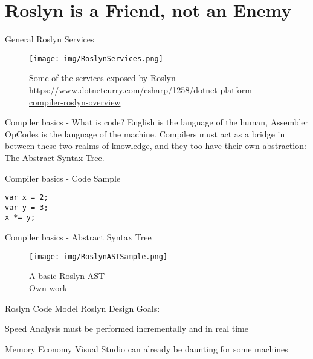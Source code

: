 \documentclass[10pt]{beamer}
\begin{document}
\section{Roslyn is a Friend, not an Enemy}
\begin{frame}{General Roslyn Services}
    \begin{figure}
        \center
        \texttt{[image: img/RoslynServices.png]}
        \caption{Some of the services exposed by Roslyn \\ \tiny{\href{Taken from DotNetCurry}{https://www.dotnetcurry.com/csharp/1258/dotnet-platform-compiler-roslyn-overview}}}
    \end{figure}
\end{frame}

\begin{frame}{Compiler basics - What is code?}
English is the language of the human, Assembler OpCodes is the language of the machine. Compilers must act as a bridge in between these two realms of knowledge, and they too have their own abstraction: The Abstract Syntax Tree.
\end{frame}

\begin{frame}[fragile]{Compiler basics - Code Sample}
\begin{verbatim}
var x = 2;
var y = 3;
x *= y;
\end{verbatim}
\end{frame}

\begin{frame}{Compiler basics - Abstract Syntax Tree}
    \begin{figure}
        \center
        \texttt{[image: img/RoslynASTSample.png]}
        \caption{A basic Roslyn AST \\ \tiny{Own work}}
    \end{figure}
\end{frame}

\begin{frame}{Roslyn Code Model}
Roslyn Design Goals:

\begin{block}{Speed}
    Analysis must be performed incrementally and in real time
\end{block}

\begin{block}{Memory Economy}
    Visual Studio can already be daunting for some machines
\end{block}
\end{frame}
\end{document}
